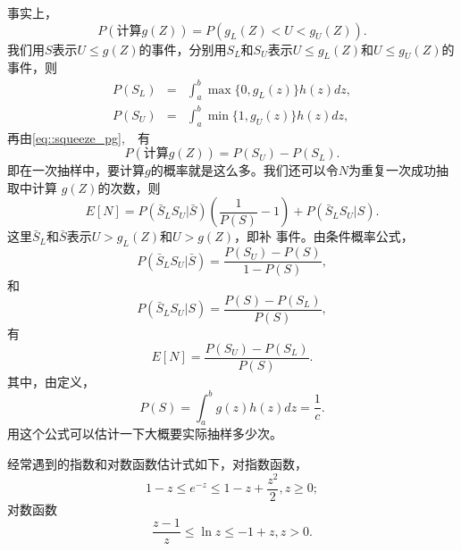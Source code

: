 事实上，
\begin{equation}
  P(\mbox{计算}g(Z)) = P(g_L(Z) < U < g_U(Z)).
  \label{eq::squeeze_pg}
\end{equation}
我们用$S$表示$U \leq g(Z)$的事件，分别用$S_L$和$S_U$表示$U \leq
g_L(Z)$和$U \leq g_U(Z)$的事件，则
\begin{eqnarray}
  P(S_L) &=& \int_a^b \max\{0, g_L(z)\}h(z)dz,\\
  \label{eq::squeeze_psl}
  P(S_U) &=& \int_a^b \min\{1, g_U(z)\}h(z)dz,
  \label{eq::squeeze_psu}
\end{eqnarray}
再由\ref{eq::squeeze_pg},　有
\begin{equation}
  P(\mbox{计算}g(Z)) = P(S_U) - P(S_L).
  \label{eq::squeeze_pg2}
\end{equation}
即在一次抽样中，要计算$g$的概率就是这么多。我们还可以令$N$为重复一次成功抽取中计算
$g(Z)$的次数，则
\begin{equation}
  E[N] = P(\bar{S}_LS_U | \bar{S})\left(\frac{1}{P(S)} - 1\right)
  + P(\bar{S}_LS_U | S).
  \label{eq::squeeze_en}
\end{equation}
这里$\bar{S}_L$和$\bar{S}$表示$U > g_L(Z)$和$U > g(Z)$，即补
事件。由条件概率公式，
\begin{equation}
  P(\bar{S}_LS_U | \bar{S}) = \frac{P(S_U) - P(S)}{1 - P(S)},
  \label{eq::squeeze_r:}
\end{equation}
和
\begin{equation}
  P(\bar{S}_LS_U | S) = \frac{P(S) - P(S_L)}{P(S)},
  \label{eq::squeeze_a}
\end{equation}
有
\begin{equation}
  E[N] = \frac{P(S_U) - P(S_L)}{P(S)}.
  \label{eq::squeeze_en_result}
\end{equation}
其中，由定义，
\begin{equation}
  P(S) = \int_a^b g(z)h(z)dz = \frac{1}{c}.
  \label{eq::squeeze_ps}
\end{equation}
用这个公式可以估计一下大概要实际抽样多少次。

经常遇到的指数和对数函数估计式如下，对指数函数，
\begin{equation}
  1 - z \leq e^{-z} \leq 1 - z + \frac{z^2}{2}, z \geq 0;
  \label{eq::squeeze_exp}
\end{equation}
对数函数
\begin{equation}
  \frac{z - 1}{z} \leq \ln z \leq -1 + z, z > 0.
\end{equation}

